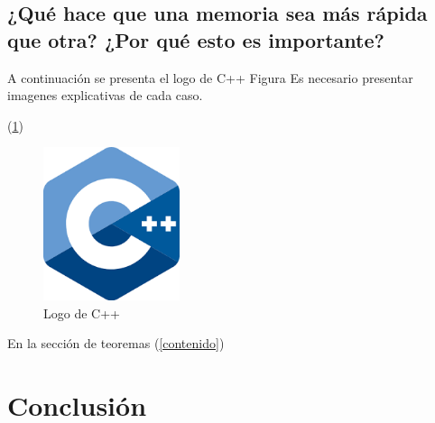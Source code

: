 \documentclass{article}
\begin{document}
\subsection{¿Qué hace que una memoria sea más rápida que otra?
            ¿Por qué esto es importante?}\label{pregunta4}
            





A continuación se presenta el logo de C++ Figura
Es necesario presentar imagenes explicativas de cada caso.

(\ref{fig:cpplogo})

\begin{figure}[h]
\includegraphics[width=4cm]{cpplogo.png}
\centering
\caption{Logo de C++}
\label{fig:cpplogo}
\end{figure}

En la sección de teoremas (\ref{contenido})

\section{Conclusión} \label{conclulsion}



\end{document}
